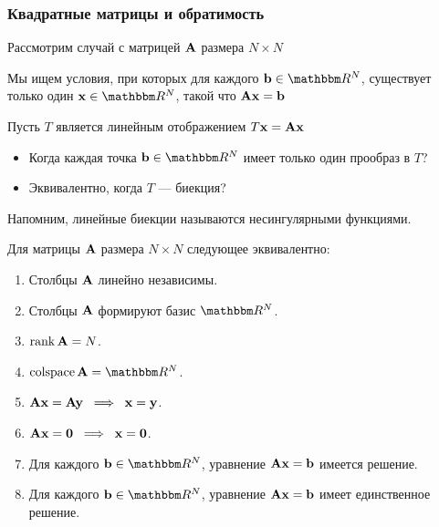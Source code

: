 \begin{frame}\frametitle{Квадратные матрицы и обратимость}

    \vspace{2em}
    Рассмотрим случай с матрицей $\mathbf A$ размера $N \times N$ 
   
   \vspace{.7em}
    Мы ищем условия, при которых для каждого $\boldb \in \RR^N$,
    существует только один $\boldx \in \RR^N$, такой что $\mathbf A {\mathbf x} = {\mathbf b}$
    
    \vspace{.7em}
    Пусть $T$ является линейным отображением $T {\mathbf x} = \mathbf A {\mathbf x}$
    \begin{itemize}
        \item Когда каждая точка $\boldb \in \RR^N$ 
        имеет только один прообраз в $T$?
        \item Эквивалентно, когда $T$ --- биекция?
    \end{itemize}
    
\end{frame}

\begin{frame}
    
    \vspace{2em}
    Напомним, линейные биекции называются несингулярными функциями.

    \vspace{.7em}
    \Fact{\eqref{ET-fa:exinv}}
        Для матрицы $\mathbf A$ размера $N \times N$ следующее эквивалентно:
        \begin{enumerate}
            \item Столбцы $\mathbf A$ линейно независимы.
            \item Столбцы $\mathbf A$ формируют базис $\RR^N$.
            \item $\operatorname{rank} \mathbf A = N$.
            \item $\colspace \boldA = \RR^N$.
            \item $\mathbf A {\mathbf x} = \mathbf A {\mathbf y} \; \implies \; {\mathbf x} = {\mathbf y}$.
            \item $\mathbf A {\mathbf x} = {\mathbf 0} \; \implies \; {\mathbf x} = {\mathbf 0}$.
            \item Для каждого $\boldb \in \RR^N$, уравнение $\mathbf A {\mathbf x} = {\mathbf b}$
                имеется решение.
            \item Для каждого $\boldb \in \RR^N$, уравнение $\mathbf A {\mathbf x} = {\mathbf b}$
                имеет единственное решение.
        \end{enumerate}

\end{frame}
  

